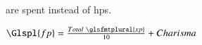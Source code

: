 \subsubsection{}
are spent instead of \glspl{hp}.

$\Glspl{fp} = \frac{Total~\glsfmtplural{xp}}{10} + Charisma$

